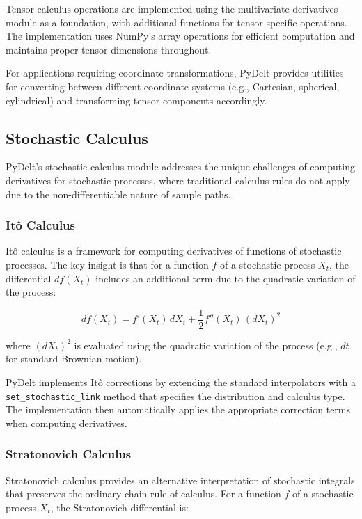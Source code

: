 \documentclass[11pt,a4paper]{article}
\begin{document}
Tensor calculus operations are implemented using the multivariate derivatives module as a foundation, with additional functions for tensor-specific operations. The implementation uses NumPy's array operations for efficient computation and maintains proper tensor dimensions throughout.

For applications requiring coordinate transformations, PyDelt provides utilities for converting between different coordinate systems (e.g., Cartesian, spherical, cylindrical) and transforming tensor components accordingly.

\subsection{Stochastic Calculus}

PyDelt's stochastic calculus module addresses the unique challenges of computing derivatives for stochastic processes, where traditional calculus rules do not apply due to the non-differentiable nature of sample paths.

\subsubsection{Itô Calculus}

Itô calculus is a framework for computing derivatives of functions of stochastic processes. The key insight is that for a function $f$ of a stochastic process $X_t$, the differential $df(X_t)$ includes an additional term due to the quadratic variation of the process:

\begin{equation}
df(X_t) = f'(X_t)\,dX_t + \frac{1}{2}f''(X_t)\,(dX_t)^2
\end{equation}

where $(dX_t)^2$ is evaluated using the quadratic variation of the process (e.g., $dt$ for standard Brownian motion).

PyDelt implements Itô corrections by extending the standard interpolators with a \texttt{set\_stochastic\_link} method that specifies the distribution and calculus type. The implementation then automatically applies the appropriate correction terms when computing derivatives.

\subsubsection{Stratonovich Calculus}

Stratonovich calculus provides an alternative interpretation of stochastic integrals that preserves the ordinary chain rule of calculus. For a function $f$ of a stochastic process $X_t$, the Stratonovich differential is:
\end{document}
